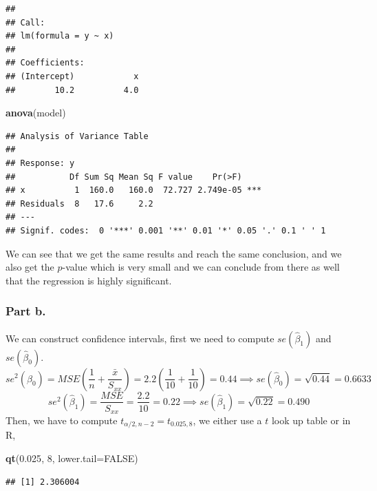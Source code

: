 \documentclass[
  11pt,
]{article}
\newenvironment{Shaded}{\begin{snugshade}}{\end{snugshade}}
\newcommand{\AttributeTok}[1]{\textcolor[rgb]{0.13,0.29,0.53}{#1}}
\newcommand{\ConstantTok}[1]{\textcolor[rgb]{0.56,0.35,0.01}{#1}}
\newcommand{\DecValTok}[1]{\textcolor[rgb]{0.00,0.00,0.81}{#1}}
\newcommand{\FloatTok}[1]{\textcolor[rgb]{0.00,0.00,0.81}{#1}}
\newcommand{\FunctionTok}[1]{\textcolor[rgb]{0.13,0.29,0.53}{\textbf{#1}}}
\newcommand{\NormalTok}[1]{#1}
\begin{document}
\begin{verbatim}
## 
## Call:
## lm(formula = y ~ x)
## 
## Coefficients:
## (Intercept)            x  
##        10.2          4.0
\end{verbatim}

\begin{Shaded}
\begin{Highlighting}[]
\FunctionTok{anova}\NormalTok{(model)}
\end{Highlighting}
\end{Shaded}

\begin{verbatim}
## Analysis of Variance Table
## 
## Response: y
##           Df Sum Sq Mean Sq F value    Pr(>F)    
## x          1  160.0   160.0  72.727 2.749e-05 ***
## Residuals  8   17.6     2.2                      
## ---
## Signif. codes:  0 '***' 0.001 '**' 0.01 '*' 0.05 '.' 0.1 ' ' 1
\end{verbatim}

We can see that we get the same results and reach the same conclusion,
and we also get the \(p\)-value which is very small and we can conclude
from there as well that the regression is highly significant.

\subsubsection{Part b.}\label{part-b.}

We can construct confidence intervals, first we need to compute
\(se(\hat{\beta}_1)\) and \(se(\hat{\beta}_0)\).
\[se^2(\hat{\beta}_0) = MSE\left(\frac{1}{n} + \frac{\bar{x}}{S_{xx}}\right) = 2.2\left(\frac{1}{10} + \frac{1}{10}\right) = 0.44 \implies se(\hat{\beta}_0) = \sqrt{0.44} = 0.6633\]
\[se^2(\hat{\beta}_1) = \frac{MSE}{S_{xx}} = \frac{2.2}{10} = 0.22 \implies se(\hat{\beta}_1) = \sqrt{0.22} = 0.490\]
Then, we have to compute \(t_{\alpha/2, n-2} = t_{0.025, 8}\), we either
use a \(t\) look up table or in R,

\begin{Shaded}
\begin{Highlighting}[]
\FunctionTok{qt}\NormalTok{(}\FloatTok{0.025}\NormalTok{, }\DecValTok{8}\NormalTok{, }\AttributeTok{lower.tail=}\ConstantTok{FALSE}\NormalTok{)}
\end{Highlighting}
\end{Shaded}

\begin{verbatim}
## [1] 2.306004
\end{verbatim}
\end{document}
